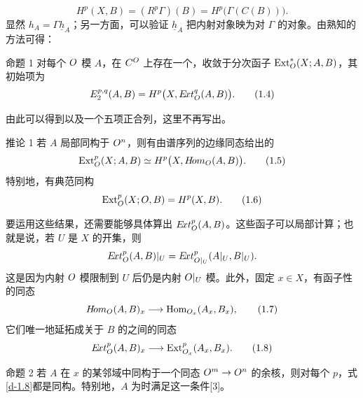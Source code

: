 \begin{equation}
H^p(X,B)=(R^p\Gamma)(B)=H^p\bigl(\Gamma(C(B))\bigr).
\tag{1.3}
\end{equation}
显然 $h_A=\Gamma\underline h_A$；另一方面，可以验证 $\underline h_A$ 把内射对象映为对 $\Gamma$ 的对象。由熟知的方法可得：
\begin{statement}{命题 1}
对每个 $O$ 模 $A$，在 $C^{O}$ 上存在一个，收敛于分次函子 $\operatorname{Ext}_{O}^{*}(X;A,B)$，其初始项为
\begin{equation}
E_2^{p,q}(A,B)=H^p\bigl(X,E\!xt_{O}^{q}(A,B)\bigr).
\tag{1.4}
\end{equation}
\end{statement}
由此可以得到以及一个五项正合列，这里不再写出。
\begin{statement}{推论 1}
若 $A$ 局部同构于 $O^n$，则有由谱序列的边缘同态给出的
\begin{equation}
\operatorname{Ext}_{O}^{p}(X;A,B)\simeq
H^p\bigl(X,H\!om_{O}(A,B)\bigr).
\tag{1.5}
\end{equation}
特别地，有典范同构
\begin{equation}
\operatorname{Ext}_{O}^{p}(X;O,B)=H^p(X,B).
\tag{1.6}
\end{equation}
\end{statement}
要运用这些结果，还需要能够具体算出 $E\!xt_{O}^{p}(A,B)$。这些函子可以局部计算；也就是说，若 $U$ 是 $X$ 的开集，则
\[
E\!xt_{O}^{p}(A,B)|_U
=E\!xt_{O|_U}^{p}(A|_U,B|_U).
\]
这是因为内射 $O$ 模限制到 $U$ 后仍是内射 $O|_U$ 模。此外，固定 $x\in X$，有函子性的同态
\begin{equation}
H\!om_{O}(A,B)_x\longrightarrow
\operatorname{Hom}_{O_x}(A_x,B_x),
\tag{1.7}
\end{equation}
它们唯一地延拓成关于 $B$ 的之间的同态
\begin{equation}
E\!xt_{O}^{p}(A,B)_x\longrightarrow
\operatorname{Ext}_{O_x}^{p}(A_x,B_x).
\tag{1.8}\label{d-1.8}
\end{equation}
\begin{statement}{命题 2}
若 $A$ 在 $x$ 的某邻域中同构于一个同态 $O^m\to O^n$ 的余核，则对每个 $p$，式\eqref{d-1.8}都是同构。特别地，$A$ 为时满足这一条件[3]。
\end{statement}


